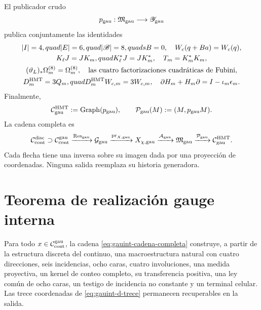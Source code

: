 El publicador crudo
\begin{equation}\label{eq:gauint-publicador-crudo}
 p_{\rm gau}:\mathfrak M_{\rm gau}\longrightarrow
 \mathscr Y_{\rm gau}
\end{equation}
publica conjuntamente las identidades
\[
 \begin{gathered}
 |I|=4,quad |E|=6,quad |\mathscr B|=8,quad sB=0,
 \quad W_c(q+Ba)=W_c(q),\\
 K_\ell J=JK_m,quad K_\ell^*J=JK_m^*,
 \quad T_m=K_m^*K_m,\\
 (\vartheta_L)_*\Omega_m^{(8)}=\Omega_m^{(8)},
 \quad \text{las cuatro factorizaciones cuadráticas de Fubini},\\
 D_m^{\rm HMT}=3Q_m,quad D_m^{\rm HMT}W_{c,m}=3W_{c,m},
 \quad \partial H_m+H_m\partial=I-\iota_m\epsilon_m.
 \end{gathered}
\]
Finalmente,
\begin{equation}\label{eq:gauint-graph-p}
 \mathcal C_{\rm gau}^{\rm HMT}:=\operatorname{Graph}(p_{\rm gau}),
 \qquad
 \mathcal P_{\rm gau}(M):=(M,p_{\rm gau}M).
\end{equation}
La cadena completa es
\begin{equation}\label{eq:gauint-cadena-completa}
 \mathcal C_{\rm cont}^{\rm disc}\supset
 \mathcal C_{\rm cont}^{\rm gau}
 \xrightarrow{\operatorname{Res}_{\rm gau}}\mathcal G_{\rm gau}
 \xrightarrow{\operatorname{pr}_{X,{\rm gau}}}X_{\chi,{\rm gau}}
 \xrightarrow{\mathcal A_{\rm gau}}\mathfrak M_{\rm gau}
 \xrightarrow{\mathcal P_{\rm gau}}\mathcal C_{\rm gau}^{\rm HMT}.
\end{equation}
Cada flecha tiene una inversa sobre su imagen dada por una proyección de
coordenadas. Ninguna salida reemplaza su historia generadora.

\section{Teorema de realización gauge interna}

\begin{theorem}
\label{thm:gauint-realizacion}
Para todo \(x\in\mathcal C_{\rm cont}^{\rm gau}\), la cadena
\eqref{eq:gauint-cadena-completa} construye, a partir de la estructura
discreta del continuo, una macroestructura natural con cuatro direcciones,
seis incidencias, ocho caras, cuatro involuciones, una medida proyectiva, un
kernel de conteo completo, su transferencia positiva, una ley común de ocho
caras, un testigo de incidencia no constante y un terminal celular. Las
trece coordenadas de \eqref{eq:gauint-d-trece} permanecen recuperables en la
salida.
\end{theorem}

